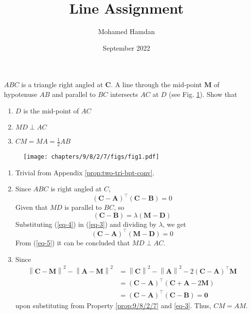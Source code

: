 \documentclass[journal,10pt,twocolumn]{article}
\title{\textbf{Line Assignment}}
\author{Mohamed Hamdan}
\date{September 2022}
\providecommand{\norm}[1]{\left\lVert#1\right\rVert}
\let\vec\mathbf
\providecommand{\brak}[1]{\ensuremath{\left(#1\right)}}
\begin{document}
\maketitle
\fi
 $ABC$ is a triangle right angled at $\vec{C}$. A line through the mid-point $\vec{M}$ of hypotenuse $AB$ and parallel to $BC$ intersects $AC$ at $D$ (see Fig.  
		\ref{fig:9/8/2/7}).
Show that
\begin{enumerate}
	\item $D$ is the mid-point of $AC$
	\item $MD \perp AC$
	\item $CM = MA = \frac{1}{2}AB$
\end{enumerate}
	\begin{figure}[H]
		\centering
 \texttt{[image: chapters/9/8/2/7/figs/fig1.pdf]}
		\caption{}
		\label{fig:9/8/2/7}
  	\end{figure}
	\solution 
	\begin{enumerate}
\item Trivial from  Appendix
		\label{prop:9/8/2/7}
	  \ref{prop:two-tri-bpt-conv}.
  \item 
Since $ABC$ is right angled at $C$,
\begin{equation}
	(\vec{C}-\vec{A})^{\top}(\vec{C}-\vec{B}) = 0	
\label{eq-3}
\end{equation}
Given that $MD$ is parallel to $BC$, so
\begin{equation}
	(\vec{C}-\vec{B}) = \lambda(\vec{M}-\vec{D})
\label{eq-4}
\end{equation}
Substituting (\ref{eq-4}) in (\ref{eq-3}) and dividing by $\lambda$, we get
\begin{equation}
	(\vec{C}-\vec{A})^{\top}(\vec{M}-\vec{D}) = 0	
\label{eq-5}
\end{equation}
From (\ref{eq-5}) it can be concluded that $MD \perp AC$.
\item Since
\begin{align}
	\norm{\vec{C}-\vec{M}}^2-\norm{\vec{A}-\vec{M}}^2 &= 	
	\norm{\vec{C}}^2-\norm{\vec{A}}^2-2\brak{\vec{C}-\vec{A}}^{\top}\vec{M} 
	\\
	&=\brak{\vec{C}-\vec{A}}^{\top}\brak{\vec{C}+\vec{A}-2\vec{M}} 
	\\
	&=\brak{\vec{C}-\vec{A}}^{\top}\brak{\vec{C}-\vec{B}} = \vec{0} 
\label{eq:9/8/2/7/sides}
\end{align}
upon substituting from 
Property		\ref{prop:9/8/2/7}
and 
\eqref{eq-3}.  Thus, $CM = AM$.

	\end{enumerate}
\end{document}
